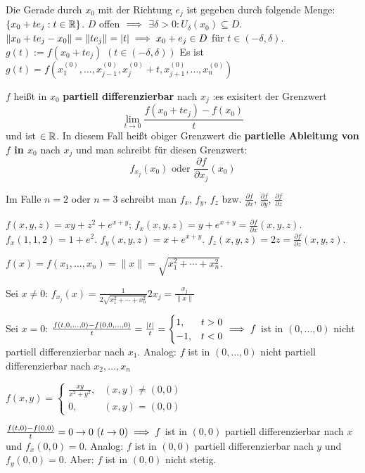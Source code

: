 \documentclass[a4paper,twoside,DIV15,BCOR12mm,chapterprefix=true,headings=twolinechapter]{scrbook}
\begin{document}
Die Gerade durch $x_0$ mit der Richtung $e_j$ ist gegeben durch folgende Menge: $\{x_0+te_j:t\in\mathbb{R}\}$. $D$ offen $\implies$ $\exists\delta>0: U_\delta(x_0)\subseteq D$. $\|x_0+te_j - x_0\| = \|te_j\| = |t| \implies x_0+e_j \in D $ für $t\in(-\delta,\delta)$. $g(t) := f(x_0+te_j)$ $(t\in(-\delta,\delta))$
 Es ist $g(t) = f(x_1^{(0)}, \ldots, x_{j-1}^{(0)}, x_j^{(0)} + t, x_{j+1}^{(0)}, \ldots, x_n^{(0)} )$

\begin{definition}
$f$ heißt in $x_0$ \textbf{partiell differenzierbar} nach $x_j$ :\equizu es exisitert 
der Grenzwert 
$$\lim_{t\to0}\frac{f(x_0+te_j) - f(x_0)}t$$ 
und ist $\in\mathbb{R}$. In diesem Fall heißt obiger Grenzwert die \textbf{partielle Ableitung 
von $f$ in $x_0$} nach $x_j$ und man schreibt für diesen Grenzwert: 
$$f_{x_j}(x_0) \text{ oder }\frac{\partial f}{\partial x_j}(x_0)$$

Im Falle $n=2$ oder $n=3$ schreibt man $f_x$, $f_y$, $f_z$ bzw. $\frac{\partial f}{\partial x}$, $\frac{\partial f}{\partial y}$, $\frac{\partial f}{\partial z}$
\end{definition}


\begin{beispiele}
\item $f(x,y,z) = xy+z^2+e^{x+y}$; $f_x(x,y,z) = y + e^{x+y} = \frac{\partial f}{\partial x}(x,y,z)$. $f_x(1,1,2)=1+e^2$. $f_y(x,y,z) = x+e^{x+y}$. $f_z(x,y,z) = 2z = \frac{\partial f}{\partial z}(x,y,z)$.
\item $f(x) = f(x_1,\ldots, x_n) = \|x\| = \sqrt{x_1^2 + \cdots + x_n^2}$.

Sei $x\ne0$: $f_{x_j}(x) = \frac{1}{2\sqrt{x_1^2 + \cdots + x_n^2}}2x_j = \frac{x_j}{\|x\|} $

Sei $x=0$: $\frac{f(t,0,\ldots,0) - f(0,0,\ldots,0)}{t} = \frac{|t|}{t} = \begin{cases} 1, &t>0\\-1,&t<0\end{cases} \implies f$ ist in $(0,\ldots,0)$ nicht partiell differenzierbar nach $x_1$. Analog: $f$ ist in $(0,\ldots,0)$ nicht partiell differenzierbar nach $x_2,\ldots,x_n$
\item $f(x,y) = \begin{cases} \frac{xy}{x^2+y^2}, &(x,y)\ne(0,0)\\0,&(x,y) = (0,0) \end{cases}$

$\frac{f(t,0) - f(0,0)}{t} = 0 \to 0 \ (t\to0) \folgt f$ ist in $(0,0)$ partiell differenzierbar nach $x$ und $f_x(0,0) = 0$. Analog: $f$ ist in $(0,0)$ partiell differenzierbar nach $y$ und $f_y(0,0) = 0$. Aber: $f$ ist in $(0,0)$ nicht stetig.
\end{beispiele}
\end{document}
